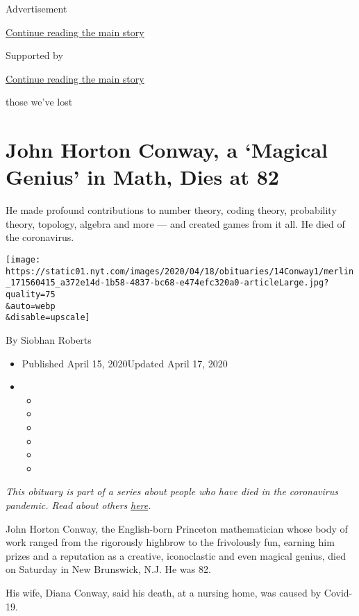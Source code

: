 Advertisement

\protect\hyperlink{after-top}{Continue reading the main story}

Supported by

\protect\hyperlink{after-sponsor}{Continue reading the main story}

those we've lost

\hypertarget{john-horton-conway-a-magical-genius-in-math-dies-at-82}{%
\section{John Horton Conway, a `Magical Genius' in Math, Dies at
82}\label{john-horton-conway-a-magical-genius-in-math-dies-at-82}}

He made profound contributions to number theory, coding theory,
probability theory, topology, algebra and more --- and created games
from it all. He died of the coronavirus.

\texttt{[image: https://static01.nyt.com/images/2020/04/18/obituaries/14Conway1/merlin\_171560415\_a372e14d-1b58-4837-bc68-e474efc320a0-articleLarge.jpg?quality=75\\\&auto=webp\\\&disable=upscale]}

By Siobhan Roberts

\begin{itemize}
\item
  Published April 15, 2020Updated April 17, 2020
\item
  \begin{itemize}
  \item
  \item
  \item
  \item
  \item
  \item
  \end{itemize}
\end{itemize}

\emph{This obituary is part of a series about people who have died in
the coronavirus pandemic. Read about others}
\href{https://www.nytimes.com/series/people-who-have-died-of-the-coronavirus}{\emph{here}}\emph{.}

John Horton Conway, the English-born Princeton mathematician whose body
of work ranged from the rigorously highbrow to the frivolously fun,
earning him prizes and a reputation as a creative, iconoclastic and even
magical genius, died on Saturday in New Brunswick, N.J. He was 82.

His wife, Diana Conway, said his death, at a nursing home, was caused by
Covid-19.

